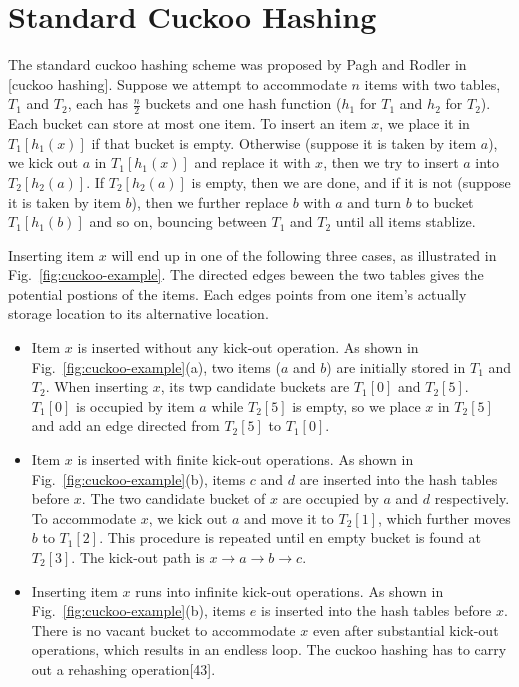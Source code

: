 \documentclass[12pt,conference,compsoc]{IEEEtran}
\begin{document}
\section{Standard Cuckoo Hashing}
\label{sec:cuckoo}
The standard cuckoo hashing scheme was proposed by Pagh and Rodler in [cuckoo hashing]. Suppose we attempt to accommodate $n$ items with two tables, $T_1$ and $T_2$, each has $\frac{n}{2}$ buckets and one hash function ($h_1$ for $T_1$ and $h_2$ for $T_2$). Each bucket can store at most one item. To insert an item $x$, we place it in $T_1[h_1(x)]$ if that bucket is empty. Otherwise (suppose it is taken by item $a$), we kick out $a$ in $T_1[h_1(x)]$ and replace it with $x$, then we try to insert $a$ into $T_2[h_2(a)]$. If $T_2[h_2(a)]$ is empty, then we are done, and if it is not (suppose it is taken by item $b$), then we further replace $b$ with $a$ and turn $b$ to bucket $T_1[h_1(b)]$ and so on, bouncing between $T_1$ and $T_2$ until all items stablize.

Inserting item $x$ will end up in one of the following three cases, as illustrated in Fig.~\ref{fig:cuckoo-example}. The directed edges beween the two tables gives the potential postions of the items. Each edges points from one item's actually storage location to its alternative location.

\begin{itemize}
    \item Item $x$ is inserted without any kick-out operation. As shown in Fig.~\ref{fig:cuckoo-example}(a), two items ($a$ and $b$) are initially stored in $T_1$ and $T_2$. When inserting $x$, its twp candidate buckets are $T_1[0]$ and $T_2[5]$. $T_1[0]$ is occupied by item $a$ while $T_2[5]$ is empty, so we place $x$ in $T_2[5]$ and add an edge directed from $T_2[5]$ to $T_1[0]$.
    \item Item $x$ is inserted with finite kick-out operations. As shown in Fig.~\ref{fig:cuckoo-example}(b), items $c$ and $d$ are inserted into the hash tables before $x$. The two candidate bucket of $x$ are occupied by $a$ and $d$ respectively. To accommodate $x$, we kick out $a$ and move it to $T_2[1]$, which further moves $b$ to $T_1[2]$. This procedure is repeated until en empty bucket is found at $T_2[3]$. The kick-out path is $x\rightarrow a\rightarrow b\rightarrow c$.
    \item Inserting item $x$ runs into infinite kick-out operations. As shown in Fig.~\ref{fig:cuckoo-example}(b), items $e$ is inserted into the hash tables before $x$. There is no vacant bucket to accommodate $x$ even after substantial kick-out operations, which results in an endless loop. The cuckoo hashing has to carry out a rehashing operation[43].
\end{itemize}
\end{document}
